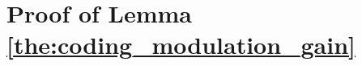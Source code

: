\documentclass[12pt,onecolumn,draftcls]{IEEEtran}
\begin{document}
\section{Proof of Lemma \ref{the:coding_modulation_gain}}\label{app:coding_gain}

%
%
\end{document}
